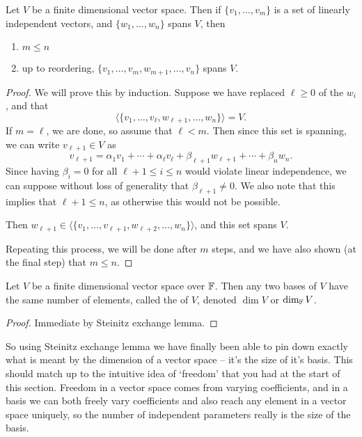 \documentclass[a4paper]{scrartcl}
\begin{document}
\begin{theorem}
    Let $V$ be a finite dimensional vector space. Then if $\{v_1, \dots, v_m\}$ is a set of linearly independent vectors, and $\{w_1, \dots, w_n\}$ spans $V$, then
    \begin{enumerate}[label=(\roman*)]
        \item $m \leq n$
        \item up to reordering, $\{v_1, \dots, v_m, w_{m + 1}, \dots, v_n\}$ spans $V$.
    \end{enumerate}
\end{theorem}
\begin{proof}
    We will prove this by induction. Suppose we have replaced $\ell \geq 0$ of the $w_i$, and that
    $$
    \langle \{ v_1, \dots, v_\ell, w_{\ell + 1}, \dots, w_n\}\rangle = V.
    $$
    If $m = \ell$, we are done, so assume that $\ell < m$. Then since this set is spanning, we can write $v_{\ell + 1} \in V$ as
    $$
    v_{\ell+1} = \alpha_1 v_1 + \cdots + \alpha_{\ell} v_{\ell} + \beta_{\ell + 1} w_{\ell + 1} + \cdots + \beta_n w_n.
    $$ 
    Since having $\beta_i = 0$ for all $\ell + 1 \leq i \leq n$ would violate linear independence, we can suppose without loss of generality that $\beta_{\ell + 1} \neq 0$. We also note that this implies that $\ell + 1 \leq n$, as otherwise this would not be possible.

    Then $w_{\ell + 1} \in \langle \{v_1, \dots, v_{\ell + 1}, w_{\ell + 2}, \dots, w_{n} \} \rangle$, and this set spans $V$.

    Repeating this process, we will be done after $m$ steps, and we have also shown (at the final step) that $m \leq n$.
\end{proof}

\begin{corollary}[Dimension]
    Let $V$ be a finite dimensional vector space over $\mathbb{F}$. Then any two bases of $V$ have the same number of elements, called the  of $V$, denoted $\dim V$ or $\dim_{\mathbb{F}} V$.
\end{corollary}
\begin{proof}
    Immediate by Steinitz exchange lemma.
\end{proof}

So using Steinitz exchange lemma we have finally been able to pin down exactly what is meant by the dimension of a vector space -- it's the size of it's basis.
This should match up to the intuitive idea of `freedom' that you had at the start of this section. Freedom in a vector space comes from varying coefficients, and in a basis we can both freely vary coefficients and also reach any element in a vector space uniquely, so the number of independent parameters really is the size of the basis.
\end{document}
